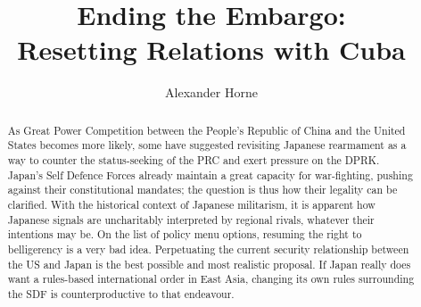 \documentclass[letterpaper,12pt,twoside]{article} %
\title{Ending the Embargo:\\Resetting Relations with Cuba}
\author{Alexander Horne}
\date{} %
\begin{document}
\begin{titlepage}
  \maketitle
\vfill

\renewcommand{\abstractname}{\sc\large Executive Summary}
\begin{abstract}

  As Great Power Competition between the People's Republic of China and the United States becomes more likely, some have suggested revisiting Japanese rearmament as a way to counter the status-seeking of the PRC and exert pressure on the DPRK. Japan's Self Defence Forces already maintain a great capacity for war-fighting, pushing against their constitutional mandates; the question is thus how their legality can be clarified. With the historical context of Japanese militarism, it is apparent how Japanese signals are uncharitably interpreted by regional rivals, whatever their intentions may be. On the list of policy menu options, resuming the right to belligerency is a very bad idea. Perpetuating the current security relationship between the US and Japan is the best possible and most realistic proposal. If Japan really does want a rules-based international order in East Asia, changing its own rules surrounding the SDF is counterproductive to that endeavour.

\end{abstract}

\end{titlepage}

\tableofcontents
  \vfill
  \pagebreak
\end{document}

